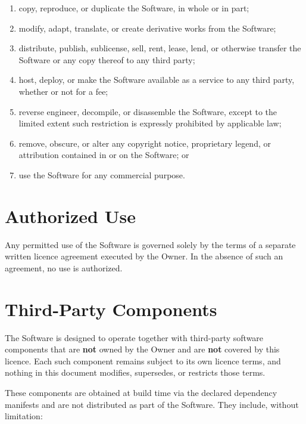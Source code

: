 \documentclass[11pt,a4paper]{article}
\begin{document}
\begin{enumerate}
    \item copy, reproduce, or duplicate the Software, in whole or in part;
    \item modify, adapt, translate, or create derivative works from the
          Software;
    \item distribute, publish, sublicense, sell, rent, lease, lend, or
          otherwise transfer the Software or any copy thereof to any third
          party;
    \item host, deploy, or make the Software available as a service to any
          third party, whether or not for a fee;
    \item reverse engineer, decompile, or disassemble the Software, except
          to the limited extent such restriction is expressly prohibited by
          applicable law;
    \item remove, obscure, or alter any copyright notice, proprietary
          legend, or attribution contained in or on the Software; or
    \item use the Software for any commercial purpose.
\end{enumerate}

\section{Authorized Use}

Any permitted use of the Software is governed solely by the terms of a
separate written licence agreement executed by the Owner. In the absence of
such an agreement, no use is authorized.

\section{Third-Party Components}

The Software is designed to operate together with third-party software
components that are \textbf{not} owned by the Owner and are \textbf{not}
covered by this licence. Each such component remains subject to its own
licence terms, and nothing in this document modifies, supersedes, or
restricts those terms.

These components are obtained at build time via the declared dependency
manifests and are not distributed as part of the Software. They include,
without limitation:
\end{document}
